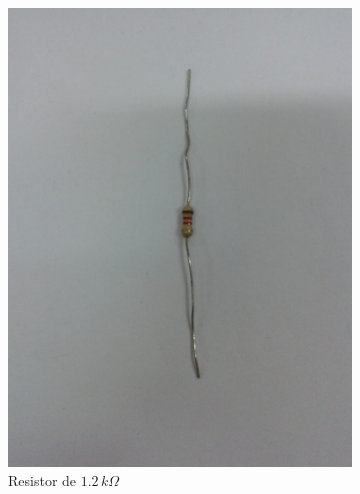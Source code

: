 \documentclass[
	12pt,				%
	openright,			%
	twoside,			%
	a4paper,			%
	article,	
	english,			%
	french,				%
	spanish,			%
	brazil				%
	]{abntex2}
\begin{document}
\begin{figure}[H]
\begin{subfigure}[H]{0.3\textwidth}
		\includegraphics[trim=14cm 15cm 12cm 14cm, clip, scale=0.3]{resistor.jpeg}
		\caption{Resistor de $1.2\,k\Omega$}
	\end{subfigure}
\hfill
	\begin{subfigure}[H]{0.3\textwidth}\center

\end{subfigure}
\end{figure}
\end{document}
